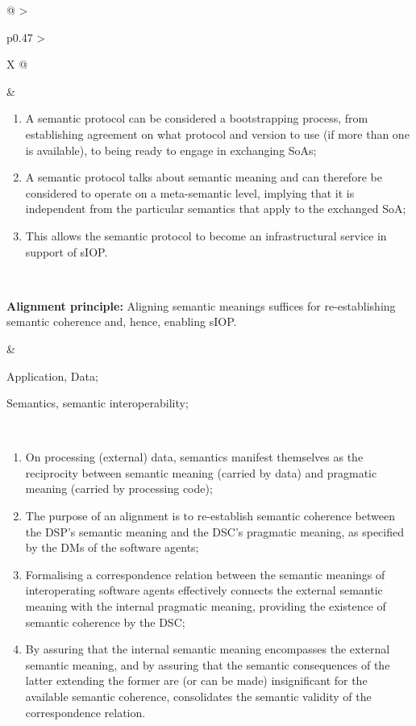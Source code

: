 \begin{xltabular}[l]{\linewidth}{@{} >{\small\raggedright\arraybackslash}p{0.47\linewidth} >{\small\raggedright\arraybackslash}X @{}}
\begin{enumerate}[left=6pt, nosep]
\end{enumerate}
&
\begin{enumerate}[left=10pt, nosep]
  \item A semantic protocol can be considered a bootstrapping process, from establishing agreement on what protocol and version to use (if more than one is available), to being ready to engage in exchanging SoAs;
  \item A semantic protocol talks about semantic meaning and can therefore be considered to operate on a meta-semantic level, implying that it is independent from the particular semantics that apply to the exchanged SoA;
  \item This allows the semantic protocol to become an infrastructural service in support of sIOP.
\end{enumerate} \\
%
%
%
\begin{mmdp}\label{dp:alignment}{\bfseries Alignment principle:}
\quad Aligning semantic meanings suffices for re-establishing semantic coherence and, hence, enabling sIOP. \end{mmdp}
&
\begin{description}[labelwidth=3.7cm,leftmargin=3.7cm+1ex,nosep,topsep=2ex,labelsep=1ex,font=\bfseries]
  \item[Type of information:] Application, Data;
  \item[Quality attributes:] Semantics, semantic interoperability;
\end{description}\\
\begin{enumerate}[left=6pt, nosep]
  \item On processing (external) data, semantics manifest themselves as the reciprocity between semantic meaning (carried by data) and pragmatic meaning (carried by processing code);
  \item The purpose of an alignment is to re-establish semantic coherence between the DSP's semantic meaning and the DSC's pragmatic meaning, as specified by the DMs of the software agents;
  \item Formalising a correspondence relation between the semantic meanings of interoperating software agents effectively connects the external semantic meaning with the internal pragmatic meaning, providing the existence of semantic coherence by the DSC;
  \item By assuring that the internal semantic meaning encompasses the external semantic meaning, and by assuring that the semantic consequences of the latter extending the former are (or can be made) insignificant for the available semantic coherence, consolidates the semantic validity of the correspondence relation.

\end{enumerate}
\end{xltabular}

